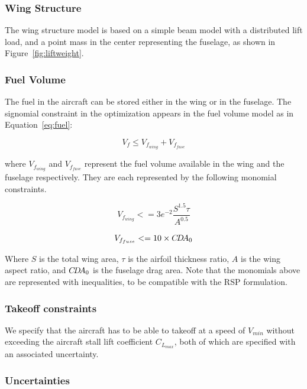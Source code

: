 \subsubsection{Wing Structure}
The wing structure model is based on a simple beam model with a distributed lift load,
and a point mass in the center representing the fuselage, as shown in Figure~\ref{fig:liftweight}.

\subsubsection{Fuel Volume}
The fuel in the aircraft can be stored either in the wing or in the fuselage.
The signomial constraint in the optimization appears in the fuel volume model as in Equation~\ref{eq:fuel}:

\begin{equation}
\label{eq:fuel}
V_f \leq V_{f_{wing}} + V_{f_{fuse}} 
\end{equation}

where $V_{f_{wing}}$ and $V_{f_{fuse}}$ represent the fuel volume available in the wing
and the fuselage respectively. They are each represented by the following monomial constraints.

\begin{equation}
\label{eq:fuelwing}
V_{f_{wing}} <= 3e^{-2}\frac{S^{1.5}\tau}{A^{0.5}}
\end{equation}

\begin{equation}
\label{eq:fuelfuse}
V_{f_{fuse}} <= 10 \times C\!D\!A_0
\end{equation}

Where $S$ is the total wing area, $\tau$ is the airfoil thickness ratio, $A$ is the wing aspect ratio, and $C\!D\!A_0$ is the fuselage drag area.
Note that the monomials above are represented with inequalities, to be compatible with the RSP formulation.

\subsubsection{Takeoff constraints}
We specify that the aircraft has to be able to takeoff at a speed of $V_{min}$
without exceeding the aircraft stall lift coefficient $C_{L_{max}}$, both of which are
specified with an associated uncertainty.

\subsubsection{Uncertainties}

